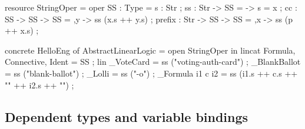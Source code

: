 \begin{lstgf}
resource StringOper = {
    oper
        SS : Type = {s : Str} ;
        ss : Str -> SS = \x -> {s = x} ;
        cc : SS -> SS -> SS = \x,y -> ss (x.s ++ y.s) ;
        prefix : Str -> SS -> SS = \p,x -> ss (p ++ x.s) ;
}
\end{lstgf}

\begin{lstgf}
concrete HelloEng of AbstractLinearLogic = open StringOper in {
    lincat 
        Formula, Connective, Ident = SS ;
    lin 
        _VoteCard = ss ("voting-auth-card") ;
        _BlankBallot = ss ("blank-ballot") ;
        _Lolli = ss ("-o") ;
        _Formula i1 c i2 = ss (i1.s ++ c.s ++ "{" ++ i2.s ++ "}") ;
}
\end{lstgf}

\subsection{Dependent types and variable bindings}
\label{03_02_04}

